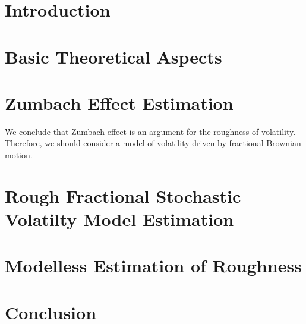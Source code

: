 


    \maketitlepage


    \begin{abstract}
        
    \end{abstract}

    \tableofcontents

    \listoffigures
    \listoftables

    
    \chapter*{Introduction}\setcounter{page}{3}

        

    \chapter{Basic Theoretical Aspects}

        

    \chapter{Zumbach Effect Estimation}

        

        

        We conclude that Zumbach effect is an argument for the roughness of volatility. Therefore, we should consider a model of volatility driven by fractional Brownian motion.

    \chapter{Rough Fractional Stochastic Volatilty Model Estimation}

        

        

    \chapter{Modelless Estimation of Roughness}

        

    \chapter*{Conclusion}

        

    \printbibliography

    
